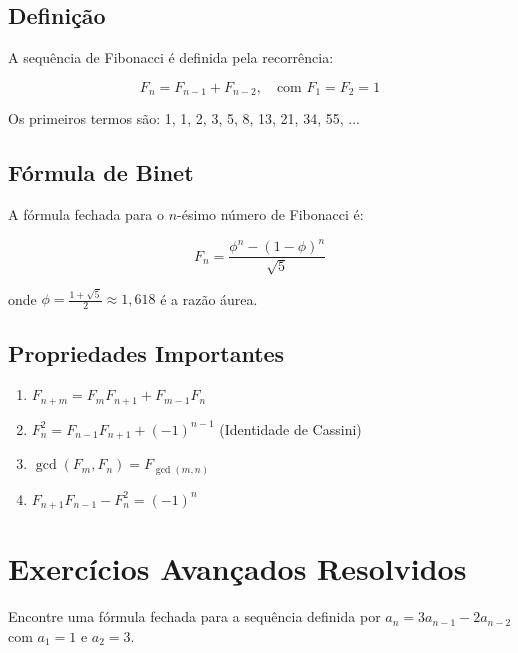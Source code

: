 \documentclass[12pt,a4paper]{article}
\begin{document}
\subsection{Definição}

A sequência de Fibonacci é definida pela recorrência:

\begin{equation}
F_n = F_{n-1} + F_{n-2}, \quad \text{com } F_1 = F_2 = 1
\end{equation}

Os primeiros termos são: 1, 1, 2, 3, 5, 8, 13, 21, 34, 55, ...

\subsection{Fórmula de Binet}

A fórmula fechada para o $n$-ésimo número de Fibonacci é:

\begin{equation}
F_n = \frac{\phi^n - (1-\phi)^n}{\sqrt{5}}
\end{equation}

onde $\phi = \frac{1+\sqrt{5}}{2} \approx 1,618$ é a razão áurea.

\subsection{Propriedades Importantes}

\begin{enumerate}
    \item $F_{n+m} = F_m F_{n+1} + F_{m-1} F_n$
    \item $F_n^2 = F_{n-1}F_{n+1} + (-1)^{n-1}$ (Identidade de Cassini)
    \item $\gcd(F_m, F_n) = F_{\gcd(m,n)}$
    \item $F_{n+1}F_{n-1} - F_n^2 = (-1)^n$
\end{enumerate}

\section{Exercícios Avançados Resolvidos}

\begin{tcolorbox}[colback=blue!5!white,colframe=blue!75!black,title=Exercício A1]
Encontre uma fórmula fechada para a sequência definida por $a_n = 3a_{n-1} - 2a_{n-2}$ com $a_1 = 1$ e $a_2 = 3$.
\end{tcolorbox}
\end{document}
